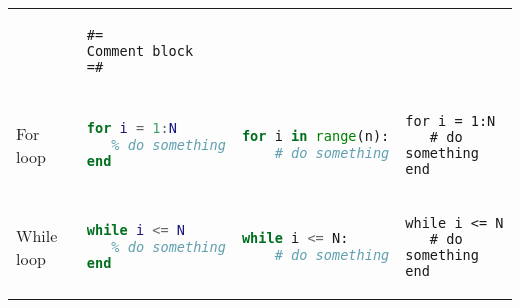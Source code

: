 \documentclass[10pt, landscape]{article}
\begin{document}
\begin{multicols}{2}
\begin{tabular}[]{@{}llll@{}}
\begin{minipage}[t]{0.22\columnwidth}
\strut
\end{minipage} & \begin{minipage}[t]{0.25\columnwidth}\raggedright\strut
\begin{lstlisting}
#=
Comment block
=#
\end{lstlisting}
\strut
\end{minipage}\tabularnewline
\begin{minipage}[t]{0.19\columnwidth}\raggedright\strut
For loop\strut
\end{minipage} & \begin{minipage}[t]{0.22\columnwidth}\raggedright\strut
\begin{lstlisting}[language=Matlab]
for i = 1:N
   % do something
end
\end{lstlisting}
\strut
\end{minipage} & \begin{minipage}[t]{0.22\columnwidth}\raggedright\strut
\begin{lstlisting}[language=Python]
for i in range(n):
    # do something
\end{lstlisting}
\strut
\end{minipage} & \begin{minipage}[t]{0.25\columnwidth}\raggedright\strut
\begin{lstlisting}
for i = 1:N
   # do something
end
\end{lstlisting}
\strut
\end{minipage}\tabularnewline
\begin{minipage}[t]{0.19\columnwidth}\raggedright\strut
While loop\strut
\end{minipage} & \begin{minipage}[t]{0.22\columnwidth}\raggedright\strut
\begin{lstlisting}[language=Matlab]
while i <= N
   % do something
end
\end{lstlisting}
\strut
\end{minipage} & \begin{minipage}[t]{0.22\columnwidth}\raggedright\strut
\begin{lstlisting}[language=Python]
while i <= N:
    # do something
\end{lstlisting}
\strut
\end{minipage} & \begin{minipage}[t]{0.25\columnwidth}\raggedright\strut
\begin{lstlisting}
while i <= N
   # do something
end
\end{lstlisting}
\strut

\end{minipage}
\end{tabular}
\end{multicols}
\end{document}
